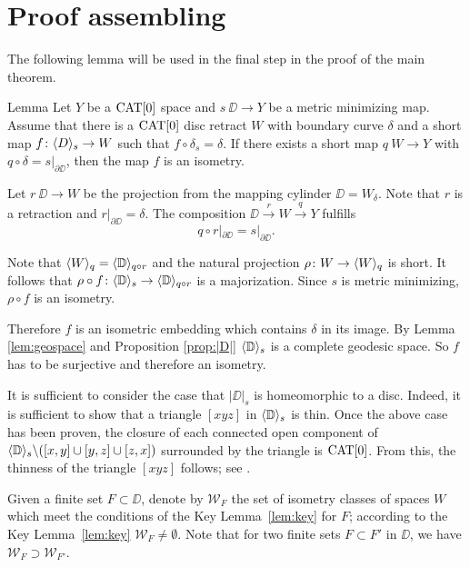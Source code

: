 \section{Proof assembling}\label{Main theorem}

The following lemma will be used in the final step in the proof of the main theorem.

\begin{thm}{Lemma}\label{lem:maj is isom}
Let $Y$ be a $\mathop{\rm CAT}\nolimits[0]$ space and $s\:\DD\to Y$ be a metric minimizing map.
Assume that there is a $\mathop{\rm CAT}\nolimits[0]$ disc retract $W$ with boundary curve $\delta$ and a short map $f\colon\langle D\rangle_s \to W$
such that $f\circ \delta_s=\delta$. If there exists a short map 
$q\: W\to Y$ with $q\circ \delta=s|_{\partial \DD}$, then the map $f$ is an isometry.
\end{thm}

Let $r\:\DD\to W$ be the projection from the mapping cylinder $\DD=W_\delta$. 
Note that $r$ is a retraction and $r|_{\partial \DD}=\delta$.
The composition $\DD\xrightarrow{r}W\xrightarrow{q} Y$ fulfills \[q\circ r|_{\partial \DD}=s|_{\partial \DD}.\]

Note that  $\langle W\rangle_q=\langle\mathbb{D}\rangle_{q\circ r}$ and the natural projection $\rho\colon W\to \langle W\rangle_q$ is short.
It follows that $\rho\circ f\colon \langle\mathbb{D}\rangle_s\to \langle\mathbb{D}\rangle_{q\circ r}$ is a majorization.
Since $s$ is metric minimizing, $\rho\circ f$ is an isometry. 

Therefore $f$ is an isometric embedding which contains $\delta$
in its image. 
By Lemma \ref{lem:geospace} and Proposition \ref{prop:|D|} $\langle\mathbb{D}\rangle_s$ is a complete geodesic space.
So $f$ has to be surjective and therefore an isometry.
\qeds

It is sufficient to consider
the case that $|\DD|_s$ is  homeomorphic to a disc.
Indeed, it is sufficient to show that a triangle $[xyz]$ in $\langle\mathbb{D}\rangle_s$ is thin. 
Once the above case has been proven, the closure of each connected open component of $\langle\mathbb{D}\rangle_s\backslash ([x,y]\cup[y,z]\cup[z,x])$
surrounded by the triangle is $\mathop{\rm CAT}\nolimits[0]$.
From this, the thinness of the triangle $[xyz]$ follows; see \cite{bishop}.


Given a finite set $F\subset \DD$,
denote by $\mathcal{W}_F$
the set of isometry classes of spaces $W$ which meet the conditions of the Key Lemma~\ref{lem:key}
for $F$;
according to the Key Lemma~\ref{lem:key} $\mathcal{W}_F\ne\emptyset$.
Note that for two finite sets $F\subset F'$ in $\DD$,
we have $\mathcal{W}_F\supset \mathcal{W}_{F'}$.

